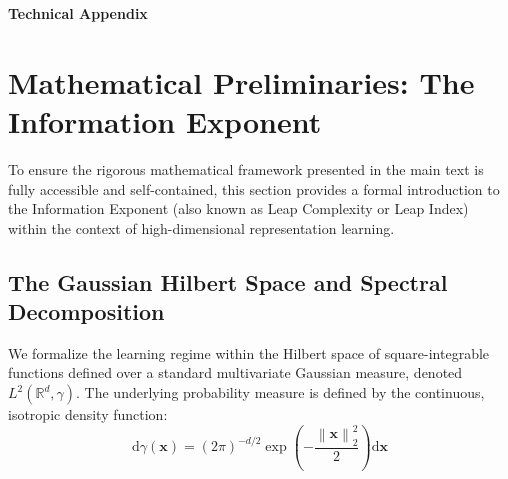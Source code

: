 \documentclass{article}
\newcommand{\R}{\mathbb{R}}
\newcommand{\1}{\mathbb{I}}
\newcommand{\diff}{\mathrm{d}}
\newcommand{\norm}[1]{\left\lVert#1\right\rVert}
\newcommand{\bx}{\mathbf{x}}
\begin{document}
















\newpage
\appendix
\renewcommand{\thesection}{\Alph{section}}
\begin{center}
    \Large \textbf{Technical Appendix}
\end{center}

\section{Mathematical Preliminaries: The Information Exponent}
\label{app:preliminaries}

To ensure the rigorous mathematical framework presented in the main text is fully accessible and self-contained, this section provides a formal introduction to the Information Exponent (also known as Leap Complexity or Leap Index) within the context of high-dimensional representation learning.

\subsection{The Gaussian Hilbert Space and Spectral Decomposition}
We formalize the learning regime within the Hilbert space of square-integrable functions defined over a standard multivariate Gaussian measure, denoted $L^2(\R^d, \gamma)$. The underlying probability measure is defined by the continuous, isotropic density function:
\begin{equation}
    \diff\gamma(\bx) = (2\pi)^{-d/2} \exp\left(-\frac{\norm{\bx}_2^2}{2}\right) \diff\bx
\end{equation}
\end{document}
